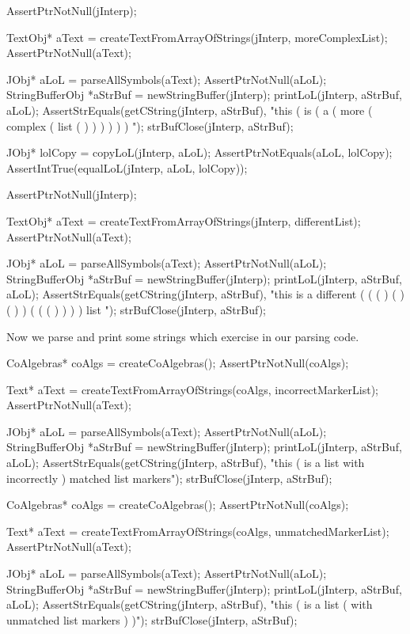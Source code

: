 \startCTest
  AssertPtrNotNull(jInterp);

  TextObj* aText =
    createTextFromArrayOfStrings(jInterp, moreComplexList);
  AssertPtrNotNull(aText);

  JObj* aLoL = parseAllSymbols(aText);
  AssertPtrNotNull(aLoL);
  StringBufferObj *aStrBuf = newStringBuffer(jInterp);
  printLoL(jInterp, aStrBuf, aLoL);
  AssertStrEquals(getCString(jInterp, aStrBuf),
    "this ( is ( a ( more ( complex ( list ( ) ) ) ) ) ) ");
  strBufClose(jInterp, aStrBuf);
  
  JObj* lolCopy = copyLoL(jInterp, aLoL);
  AssertPtrNotEquals(aLoL, lolCopy);
  AssertIntTrue(equalLoL(jInterp, aLoL, lolCopy));
\stopCTest
\stopTestCase

\startCTest
  AssertPtrNotNull(jInterp);

  TextObj* aText =
    createTextFromArrayOfStrings(jInterp, differentList);
  AssertPtrNotNull(aText);

  JObj* aLoL = parseAllSymbols(aText);
  AssertPtrNotNull(aLoL);
  StringBufferObj *aStrBuf = newStringBuffer(jInterp);
  printLoL(jInterp, aStrBuf, aLoL);
  AssertStrEquals(getCString(jInterp, aStrBuf),
    "this is a different ( ( ( ) ( ) ( ) ) ( ( ( ) ) ) ) list ");
  strBufClose(jInterp, aStrBuf);
\stopCTest
\stopTestCase

Now we parse and print some strings which exercise  
in our parsing code. 

\startCTest
  CoAlgebras* coAlgs = createCoAlgebras();
  AssertPtrNotNull(coAlgs);

  Text* aText = createTextFromArrayOfStrings(coAlgs, incorrectMarkerList);
  AssertPtrNotNull(aText);

  JObj* aLoL = parseAllSymbols(aText);
  AssertPtrNotNull(aLoL);
  StringBufferObj *aStrBuf = newStringBuffer(jInterp);
  printLoL(jInterp, aStrBuf, aLoL);
  AssertStrEquals(getCString(jInterp, aStrBuf),
    "this ( is a list with incorrectly ) matched list markers");
  strBufClose(jInterp, aStrBuf);
\stopCTest
\ignoreTestCase

\startCTest
  CoAlgebras* coAlgs = createCoAlgebras();
  AssertPtrNotNull(coAlgs);

  Text* aText = createTextFromArrayOfStrings(coAlgs, unmatchedMarkerList);
  AssertPtrNotNull(aText);

  JObj* aLoL = parseAllSymbols(aText);
  AssertPtrNotNull(aLoL);
  StringBufferObj *aStrBuf = newStringBuffer(jInterp);
  printLoL(jInterp, aStrBuf, aLoL);
  AssertStrEquals(getCString(jInterp, aStrBuf),
    "this ( is a list ( with unmatched list markers ) )");
  strBufClose(jInterp, aStrBuf);
\stopCTest
\ignoreTestCase
\stopTestSuite

